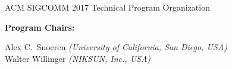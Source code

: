 \documentclass[sigconf]{acmart}
\begin{document}
\onecolumn

\begin{center}
{\huge ACM SIGCOMM 2017 Technical Program Organization}
\end{center}

\vspace{.10in}

\setlength\parindent{0pt}

\begin{minipage}[t]{.3\textwidth}
{\bf Program Chairs:}
\end{minipage}
\begin{minipage}[t]{.9\textwidth}
Alex C.~Snoeren {\it (University of California, San Diego, USA)}\\
Walter Willinger {\it (NIKSUN, Inc., USA)}\\
\end{minipage}
\end{document}
